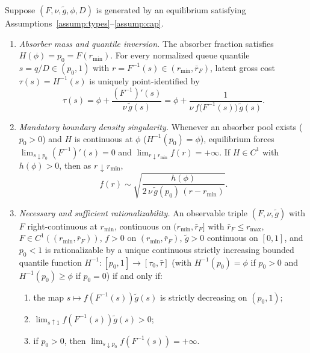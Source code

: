 \begin{theorem}\label{thm:gpv}
Suppose $(F, \nu, \tilde{g}, \phi, D)$ is generated by an equilibrium satisfying Assumptions~\ref{assump:types}--\ref{assump:cap}.
\begin{enumerate}[label=(\roman*), leftmargin=2.2em, itemsep=2pt]
\item \emph{Absorber mass and quantile inversion.} The absorber fraction satisfies $H(\phi) = p_0 = F(r_{\min})$. For every normalized queue quantile $s = q/D \in (p_0, 1)$ with $r = F^{-1}(s) \in (r_{\min}, \bar{r}_F)$, latent gross cost $\tau(s) = H^{-1}(s)$ is uniquely point-identified by
\begin{equation}\label{eq:gpv_inv}
\tau(s) = \phi + \frac{(F^{-1})'(s)}{\nu\,\tilde{g}(s)} = \phi + \frac{1}{\nu\,f\bigl(F^{-1}(s)\bigr)\,\tilde{g}(s)}.
\end{equation}
\item \emph{Mandatory boundary density singularity.} Whenever an absorber pool exists ($p_0 > 0$) and $H$ is continuous at $\phi$ ($H^{-1}(p_0) = \phi$), equilibrium forces $\lim_{s \downarrow p_0} (F^{-1})'(s) = 0$ and $\lim_{r \downarrow r_{\min}} f(r) = +\infty$. If $H \in C^1$ with $h(\phi) > 0$, then as $r \downarrow r_{\min}$,
\begin{equation}\label{eq:gpv_singularity}
f(r) \sim \sqrt{\frac{h(\phi)}{2\,\nu\,\tilde{g}(p_0)\,(r - r_{\min})}}.
\end{equation}
\item \emph{Necessary and sufficient rationalizability.} An observable triple $(F, \nu, \tilde{g})$ with $F$ right-continuous at $r_{\min}$, continuous on $(r_{\min}, \bar{r}_F]$ with $\bar{r}_F \le r_{\max}$, $F \in C^1((r_{\min}, \bar{r}_F))$, $f > 0$ on $(r_{\min}, \bar{r}_F)$, $\tilde{g} > 0$ continuous on $[0, 1]$, and $p_0 < 1$ is rationalizable by a unique continuous strictly increasing bounded quantile function $H^{-1} : [p_0, 1] \to [\tau_0, \bar{\tau}]$ (with $H^{-1}(p_0) = \phi$ if $p_0 > 0$ and $H^{-1}(p_0) \ge \phi$ if $p_0 = 0$) if and only if:
\begin{enumerate}[label=(GPV-\arabic*), leftmargin=4.2em, itemsep=1pt]
\item the map $s \mapsto f(F^{-1}(s))\tilde{g}(s)$ is strictly decreasing on $(p_0, 1)$;
\item $\lim_{s \uparrow 1} f(F^{-1}(s))\tilde{g}(s) > 0$;
\item if $p_0 > 0$, then $\lim_{s \downarrow p_0} f(F^{-1}(s)) = +\infty$.
\end{enumerate}
\end{enumerate}
\end{theorem}

